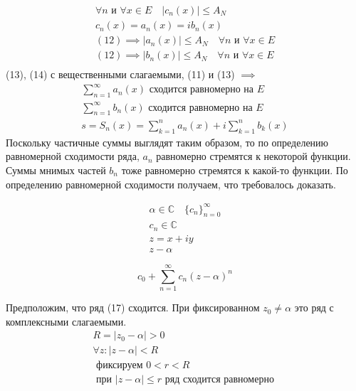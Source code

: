 \documentclass[main]{subfiles}
\begin{document}
\begin{longProof}
    \begin{gather*}
        \forall n \text{ и } \forall x \in E \quad |c_n(x)| \leq A_N \tag{12} \\
        c_n(x) = a_n(x) = ib_n(x) \\
        (12) \implies |a_n(x) | \leq A_N \quad \forall n \text{ и } \forall x \in E \tag{13}\\
        (12) \implies |b_n(x) | \leq A_N \quad \forall n \text{ и } \forall x \in E \tag{14}\\
    \end{gather*}
    (13), (14) с вещественными слагаемыми, (11) и (13) $\implies$
    \begin{gather*}
        \sum^\infty_{n=1} a_n(x) \text{ сходится равномерно на } E \tag{15}\\
        \sum^\infty_{n=1} b_n(x) \text{ сходится равномерно на } E \tag{16}\\
        s=S_n(x) = \sum^n_{k=1} a_n(x) + i \sum^n_{k=1} b_k(x)
    \end{gather*}
    Поскольку частичные суммы выглядят таким образом, то по определению равномерной сходимости ряда, $a_n$
    равномерно стремятся к некоторой функции. Суммы мнимых частей $b_n$ тоже равномерно стремятся к какой-то функции.
    По определению равномерной сходимости получаем, что требовалось доказать.
\end{longProof} 
\begin{gather*}
    \alpha \in \mathbb{C} \quad \{ c_n \} ^\infty_{n=0} \\
    c_n \in \mathbb{C} \\
    z = x + iy \\
    z - \alpha
\end{gather*}
\begin{definition}
    \[ c_0 + \sum^\infty_{n=1} c_n(z-\alpha)^n \tag{17} \]
\end{definition}
\begin{lemma}[Абеля]
    Предположим, что ряд (17) сходится. При фиксированном $z_0 \ne \alpha$ это ряд с комплексными 
    слагаемыми.
    \begin{gather*}
        R = |z_0 - \alpha| > 0 \\
        \forall z : |z-\alpha| < R \tag{18}\\
        \text{ фиксируем } 0 < r < R  \\
        \text{ при } |z-\alpha| \leq r \text{ ряд сходится равномерно }
    \end{gather*} 
\end{lemma}
\end{document}
